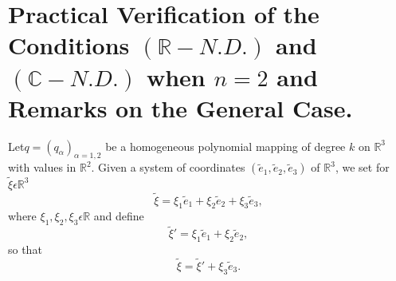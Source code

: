 
\makeatletter

\def\@makechapterhead#1{%
  \vspace*{50\p@}%
  {\parindent \z@ \raggedright \normalfont
    \ifnum \c@secnumdepth >\m@ne
      \if@mainmatter
        \huge\bfseries Appendix\space \thechapter
       \par\nobreak
        \vskip 20\p@
      \fi
    \fi
    \interlinepenalty\@M
    \Huge \bfseries #1 \par\nobreak
    \vskip 40\p@
  }}

\renewcommand\thesection{\@Alph\thechapter.\@arabic\c@section}

\def\@chapter[#1]#2{\ifnum \c@secnumdepth >\m@ne
                       \if@mainmatter
                         \refstepcounter{chapter}%
                         \typeout{\@chapapp\space\thechapter.}%
                         \addcontentsline{toc}{chapter}%
                                   {\protect\numberline{}
                         Appendix 1: #1}%
                       \else
                         \addcontentsline{toc}{chapter}{#1}%
                       \fi
                    \else
                      \addcontentsline{toc}{chapter}{#1}%
                    \fi
                    \chaptermark{#1}%
                    \addtocontents{lof}{\protect\addvspace{10\p@}}%
                    \addtocontents{lot}{\protect\addvspace{10\p@}}%
                    \if@twocolumn
                      \@topnewpage[\@makechapterhead{#2}]%
                    \else
                      \@makechapterhead{#2}%
                      \@afterheading
                    \fi}

\makeatother

\setcounter{chapter}{0}
\chapter[Practical Verification of the Conditions.....]{Practical Verification of the Conditions $(\mathbb{R} - N. D.)$ and $(\mathbb{C}- N. D.)$ when $n = 2$ and Remarks on the General Case.}


Let\pageoriginale $q = (q_{\alpha})_{\alpha = 1, 2}$ be a homogeneous polynomial mapping of degree $k$ on $\mathbb{R}^{3}$ with values in $\mathbb{R}^{2}$. Given a system of coordinates $(\widetilde{e}_{1}, \widetilde{e}_{2}, \widetilde{e}_{3})$ of $\mathbb{R}^{3}$, we set for $\widetilde{\xi} \epsilon \mathbb{R}^{3}$
\begin{equation*}
\widetilde{\xi} = \xi_{1} \widetilde{e}_{1} + \xi_{2}\widetilde{e}_{2} + \xi_{3} \widetilde{e}_{3},\tag{A.1}\label{chap5-eqA.1}
\end{equation*}
where $\xi_{1}, \xi_{2}, \xi_{3} \epsilon \mathbb{R}$ and define
\begin{equation*}
{\widetilde{\xi}}' = \xi_{1} \widetilde{e}_{1} + \xi_{2} \widetilde{e}_{2},\tag{A.2}\label{chap5-eqA.2}
\end{equation*}
so that 
\begin{equation*}
\widetilde{\xi} = {\widetilde{\xi}}' + \xi_{3} \widetilde{e}_{3}.\tag{A.3}\label{chap5-eqA.3}
\end{equation*}

